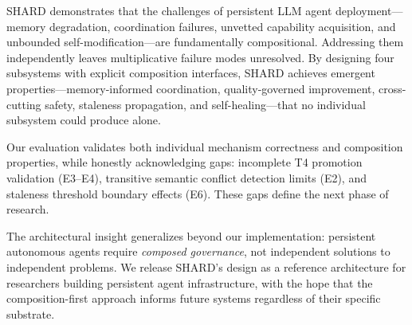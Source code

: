 \documentclass[11pt]{article}
\begin{document}
SHARD demonstrates that the challenges of persistent LLM agent deployment---memory degradation, coordination failures, unvetted capability acquisition, and unbounded self-modification---are fundamentally compositional. Addressing them independently leaves multiplicative failure modes unresolved. By designing four subsystems with explicit composition interfaces, SHARD achieves emergent properties---memory-informed coordination, quality-governed improvement, cross-cutting safety, staleness propagation, and self-healing---that no individual subsystem could produce alone.

Our evaluation validates both individual mechanism correctness and composition properties, while honestly acknowledging gaps: incomplete T4 promotion validation (E3--E4), transitive semantic conflict detection limits (E2), and staleness threshold boundary effects (E6). These gaps define the next phase of research.

The architectural insight generalizes beyond our implementation: persistent autonomous agents require \emph{composed governance}, not independent solutions to independent problems. We release SHARD's design as a reference architecture for researchers building persistent agent infrastructure, with the hope that the composition-first approach informs future systems regardless of their specific substrate.
\end{document}
